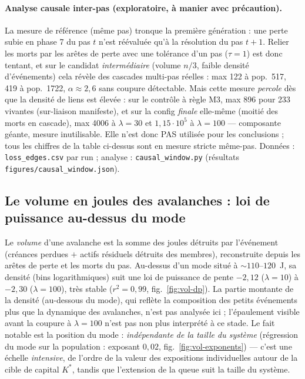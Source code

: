 \documentclass[11pt,a4paper]{article}
\newcommand{\code}[1]{\texttt{#1}}
\begin{document}
\paragraph{Analyse causale inter-pas (exploratoire, à manier avec
précaution).} La mesure de référence (même pas) tronque la première
génération : une perte subie en phase 7 du pas $t$ n'est réévaluée qu'à la
résolution du pas $t+1$. Relier les morts par les arêtes de perte avec une
tolérance d'un pas ($\tau = 1$) est donc tentant, et sur le candidat
\emph{intermédiaire} (volume $n/3$, faible densité d'événements) cela révèle
des cascades multi-pas réelles : max 122 à pop.\ 517, 419 à pop.\ 1722,
$\alpha \approx 2{,}6$ sans coupure détectable. Mais cette mesure
\emph{percole} dès que la densité de liens est élevée : sur le contrôle à
règle M3, max 896 pour 233 vivantes (sur-liaison manifeste), et sur la
config \emph{finale} elle-même (moitié des morts en cascade), max 4006 à
$\lambda{=}30$ et $1{,}15 \cdot 10^5$ à $\lambda{=}100$ --- composante
géante, mesure inutilisable. Elle n'est donc PAS utilisée pour les
conclusions ; tous les chiffres de la table ci-dessus sont en mesure stricte
même-pas. Données : \code{loss\_edges.csv} par run ; analyse :
\code{causal\_window.py} (résultats \code{figures/causal\_window.json}).

\subsection{Le volume en joules des avalanches : loi de puissance au-dessus du mode}
\label{sec:volume}

Le \emph{volume} d'une avalanche est la somme des joules détruits par
l'événement (créances perdues $+$ actifs résiduels détruits des membres),
reconstruite depuis les arêtes de perte et les morts du pas. Au-dessus
d'un mode situé à ${\sim}110$--$120$~J, sa densité (bins logarithmiques)
suit une loi de puissance de pente $-2{,}12$ ($\lambda{=}10$) à
$-2{,}30$ ($\lambda{=}100$), très stable ($r^2 = 0{,}99$,
fig.~\ref{fig:vol-dp}). La partie montante de la densité (au-dessous du
mode), qui reflète la composition des petits événements plus que la
dynamique des avalanches, n'est pas analysée ici ; l'épaulement visible
avant la coupure à $\lambda{=}100$ n'est pas non plus interprété à ce
stade. Le fait notable est la position du mode :
\emph{indépendante de la taille du système} (régression du mode sur la
population : exposant $0{,}02$, fig.~\ref{fig:vol-exponents}) --- c'est
une échelle \emph{intensive}, de l'ordre de la valeur des expositions
individuelles autour de la cible de capital $K^*$, tandis que
l'extension de la queue suit la taille du système.
\end{document}
